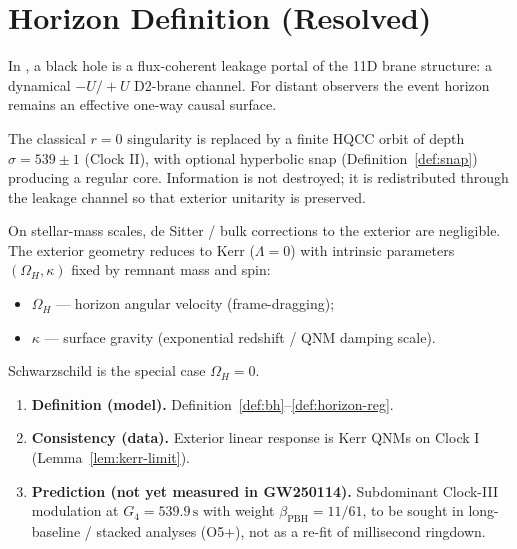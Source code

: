 \section{Horizon Definition (Resolved)}
\label{sec:horizon}

\begin{definition}
\label{def:bh}
In \model, a black hole is a flux-coherent leakage portal of the 11D brane
structure: a dynamical \(-U/+U\) D2-brane channel. For distant observers the
event horizon remains an effective one-way causal surface.
\end{definition}

\begin{definition}
\label{def:horizon-reg}
The classical \(r=0\) singularity is replaced by a finite HQCC orbit of depth
\(\sigma=539\pm 1\) (Clock II), with optional hyperbolic snap
(Definition~\ref{def:snap}) producing a regular core. Information is not
destroyed; it is redistributed through the leakage channel so that exterior
unitarity is preserved.
\end{definition}

\begin{lemma}
\label{lem:kerr-limit}
On stellar-mass scales, de Sitter / bulk corrections to the exterior are
negligible. The exterior geometry reduces to Kerr (\(\Lambda=0\)) with
intrinsic parameters \((\Omega_H,\kappa)\) fixed by remnant mass and spin:
\begin{itemize}
  \item \(\Omega_H\) --- horizon angular velocity (frame-dragging);
  \item \(\kappa\) --- surface gravity (exponential redshift / QNM damping scale).
\end{itemize}
Schwarzschild is the special case \(\Omega_H=0\).
\end{lemma}

\begin{theorem}
\label{thm:claim-ladder}
\begin{enumerate}[label=(\roman*)]
  \item \textbf{Definition (model).} Definition~\ref{def:bh}--\ref{def:horizon-reg}.
  \item \textbf{Consistency (data).} Exterior linear response is Kerr QNMs on
        Clock I (Lemma~\ref{lem:kerr-limit}).
  \item \textbf{Prediction (not yet measured in GW250114).} Subdominant
        Clock-III modulation at \(G_4=539.9\,\mathrm{s}\) with weight
        \(\beta_{\mathrm{PBH}}=11/61\), to be sought in long-baseline / stacked
        analyses (O5+), not as a re-fit of millisecond ringdown.
\end{enumerate}
\end{theorem}

